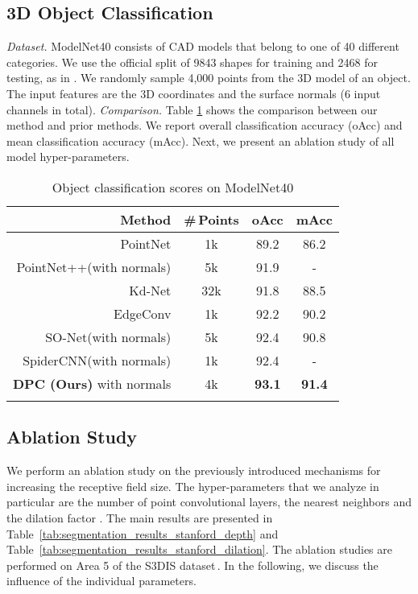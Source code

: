 \documentclass[letterpaper, 10 pt, conference]{ieeeconf}
\newcommand{\reftab}[1]{Table~\ref{tab:#1}}
\newcommand{\parag}[1]{\vspace{0ex} \textit{#1}}
\begin{document}
\subsection{3D Object Classification}
\parag{Dataset.} ModelNet40 consists of CAD models that belong to one of 40
different categories. We use the official split of 9843 shapes
for training and 2468 for testing, as in \cite{Qi17NIPS}.
We randomly sample 4,000 points from the 3D model of an object.
The input features are the 3D coordinates and the surface normals (6 input channels in total).
\parag{Comparison.}
Table \ref{tab:scores_modelnet40} shows the comparison between our method and prior methods.
We report overall classification accuracy (oAcc) and mean classification accuracy (mAcc).
Next, we present an ablation study of all model hyper-parameters.
\begin{table}[t]
\center
\vspace{5px}
\caption{Object classification scores on ModelNet40}
\setlength{\tabcolsep}{9pt}
\begin{tabular}{rccc}
\toprule 
\textbf{Method} & \textbf{\#\,Points} &\textbf{oAcc} & \textbf{mAcc}   \\
\midrule
PointNet\cite{Qi17CVPR}								& 1k 		& 89.2 & 86.2\\
PointNet++(with normals)\cite{Qi17NIPS}		& 5k 		& 91.9 & -\\
Kd-Net\cite{Klokov17ICCV}							& 32k 	& 91.8 &88.5\\
EdgeConv\cite{Wang18CoRR}						& 1k		& 92.2 & 90.2\\
SO-Net(with normals)\cite{Li18CVPR}			& 5k		& 92.4 & 90.8\\
SpiderCNN(with normals)\cite{Xu18ECCV}	& 1k		& 92.4 & -\\
\textbf{DPC (Ours)} with normals 					& 4k		& \textbf{93.1} & \textbf{91.4}   \\
\bottomrule 
\vspace{-17px}
\end{tabular} 
\label{tab:scores_modelnet40}    
\end{table} 
\subsection{Ablation Study}
We perform an ablation study on the previously introduced mechanisms for increasing the receptive field size.
The hyper-parameters that we analyze in particular are the number of point convolutional layers, the nearest neighbors  and the dilation factor .
The main results are presented in 
\reftab{segmentation_results_stanford_depth} and \reftab{segmentation_results_stanford_dilation}.
The ablation studies are performed on Area 5 of the S3DIS dataset\,\cite{Armeni16CVPR}.
In the following, we discuss the influence of the individual parameters.
\end{document}
